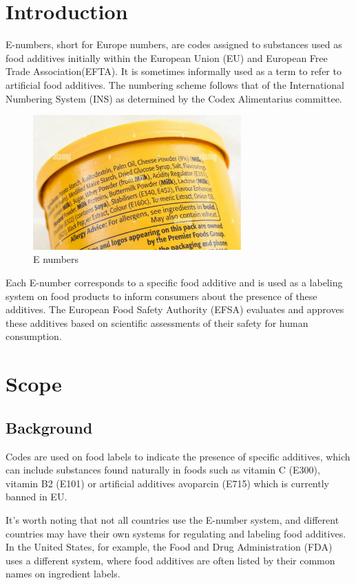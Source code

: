 \documentclass[a4paper,12pt]{report}
\begin{document}
\section*{Introduction}
E-numbers, short for Europe numbers, are codes assigned to substances used as food additives initially within the European Union (EU) and European Free Trade Association(EFTA). It is sometimes informally used as a term to refer to artificial food additives. The numbering scheme follows that of the International Numbering System (INS) as determined by the Codex Alimentarius committee.
\begin{figure}[H]
	\centering
	\includegraphics[width=8cm,keepaspectratio]{e-no2.jpg}
	\caption{E numbers}
\end{figure}
Each E-number corresponds to a specific food additive and is used as a labeling system on food products to inform consumers about the presence of these additives. The European Food Safety Authority (EFSA) evaluates and approves these additives based on scientific assessments of their safety for human consumption.



\section*{Scope}
\subsection*{Background}
Codes are used on food labels to indicate the presence of specific additives, which can include substances found naturally in foods such as vitamin C (E300), vitamin B2 (E101) or artificial additives avoparcin (E715) which is currently banned in EU.

It's worth noting that not all countries use the E-number system, and different countries may have their own systems for regulating and labeling food additives. In the United States, for example, the Food and Drug Administration (FDA) uses a different system, where food additives are often listed by their common names on ingredient labels.
\end{document}
